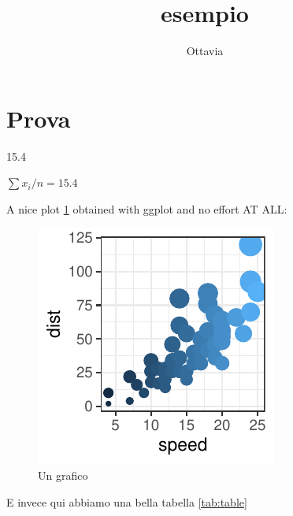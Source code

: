 \documentclass{article}
\begin{document}



\author{Ottavia}
\title{esempio}

\maketitle

\section{Prova}

\begin{Schunk}
\end{Schunk}

15.4

\verb*||

$\sum x_i / n = 15.4$


A nice plot \ref{fig:plot} obtained with ggplot and no effort AT ALL:

\begin{figure}
\caption{Un grafico}
\label{fig:plot}
\centering
\includegraphics{texProva-002}

\end{figure}

E invece qui abbiamo una bella tabella \ref{tab:table}
\end{document}

